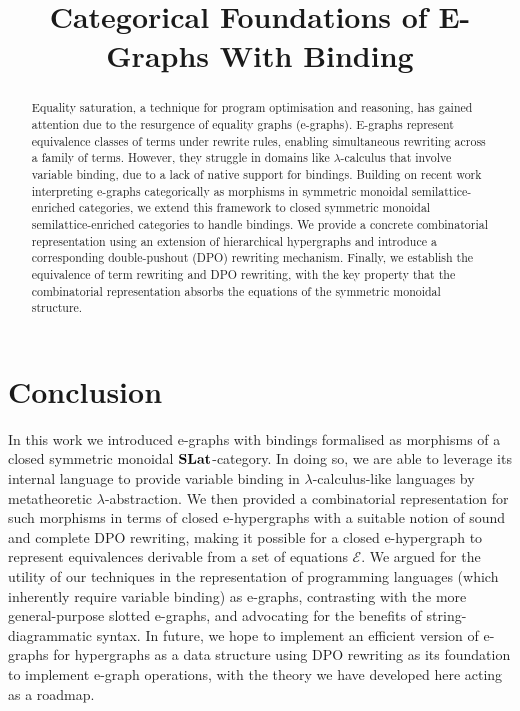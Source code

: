 \documentclass[acmsmall,screen, nonacm, review, anonymous]{acmart}
\title{Categorical Foundations of E-Graphs With Binding}
\begin{document}
\begin{abstract}
	Equality saturation, a technique for program optimisation and reasoning, has gained attention due to the resurgence of equality graphs (e-graphs).
	E-graphs represent equivalence classes of terms under rewrite rules, enabling simultaneous rewriting across a family of terms.
	However, they struggle in domains like $\lambda$-calculus that involve variable binding, due to a lack of native support for bindings.
	Building on recent work interpreting e-graphs categorically as morphisms in symmetric monoidal semilattice-enriched categories, we extend this framework to closed symmetric monoidal semilattice-enriched categories to handle bindings.
	We provide a concrete combinatorial representation using an extension of hierarchical hypergraphs and introduce a corresponding double-pushout (DPO) rewriting mechanism.
	Finally, we establish the equivalence of term rewriting and DPO rewriting, with the key property that the combinatorial representation absorbs the equations of the symmetric monoidal structure.
\end{abstract}

\maketitle







\section{Conclusion}
In this work we introduced e-graphs with bindings formalised as morphisms of a closed symmetric monoidal $\mathbf{SLat}$-category.
In doing so, we are able to leverage its internal language to provide variable binding in $\lambda$-calculus-like languages by metatheoretic $\lambda$-abstraction.
We then provided a combinatorial representation for such morphisms in terms of closed e-hypergraphs with a suitable notion of sound and complete DPO rewriting, making it possible for a closed e-hypergraph to represent equivalences derivable from a set of equations $\mathcal{E}$.
We argued for the utility of our techniques in the representation of programming languages (which inherently require variable binding) as e-graphs, contrasting with the more general-purpose slotted e-graphs, and advocating for the benefits of string-diagrammatic syntax.
In future, we hope to implement an efficient version of e-graphs for hypergraphs as a data structure using DPO rewriting as its foundation to implement e-graph operations, with the theory we have developed here acting as a roadmap.




\appendix


\end{document}
